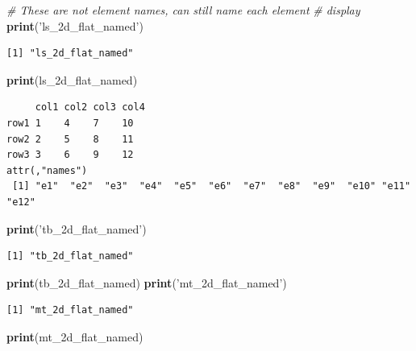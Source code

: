 \documentclass[
]{book}
\newenvironment{Shaded}{\begin{snugshade}}{\end{snugshade}}
\newcommand{\CommentTok}[1]{\textcolor[rgb]{0.56,0.35,0.01}{\textit{#1}}}
\newcommand{\KeywordTok}[1]{\textcolor[rgb]{0.13,0.29,0.53}{\textbf{#1}}}
\newcommand{\NormalTok}[1]{#1}
\newcommand{\StringTok}[1]{\textcolor[rgb]{0.31,0.60,0.02}{#1}}
\begin{document}
\begin{Shaded}
\begin{Highlighting}[]
\CommentTok{# These are not element names, can still name each element}
\CommentTok{# display}
\KeywordTok{print}\NormalTok{(}\StringTok{'ls_2d_flat_named'}\NormalTok{)}
\end{Highlighting}
\end{Shaded}

\begin{verbatim}
[1] "ls_2d_flat_named"
\end{verbatim}

\begin{Shaded}
\begin{Highlighting}[]
\KeywordTok{print}\NormalTok{(ls_2d_flat_named)}
\end{Highlighting}
\end{Shaded}

\begin{verbatim}
     col1 col2 col3 col4
row1 1    4    7    10  
row2 2    5    8    11  
row3 3    6    9    12  
attr(,"names")
 [1] "e1"  "e2"  "e3"  "e4"  "e5"  "e6"  "e7"  "e8"  "e9"  "e10" "e11" "e12"
\end{verbatim}

\begin{Shaded}
\begin{Highlighting}[]
\KeywordTok{print}\NormalTok{(}\StringTok{'tb_2d_flat_named'}\NormalTok{)}
\end{Highlighting}
\end{Shaded}

\begin{verbatim}
[1] "tb_2d_flat_named"
\end{verbatim}

\begin{Shaded}
\begin{Highlighting}[]
\KeywordTok{print}\NormalTok{(tb_2d_flat_named)}
\KeywordTok{print}\NormalTok{(}\StringTok{'mt_2d_flat_named'}\NormalTok{)}
\end{Highlighting}
\end{Shaded}

\begin{verbatim}
[1] "mt_2d_flat_named"
\end{verbatim}

\begin{Shaded}
\begin{Highlighting}[]
\KeywordTok{print}\NormalTok{(mt_2d_flat_named)}
\end{Highlighting}
\end{Shaded}
\end{document}
